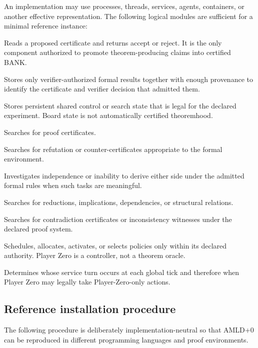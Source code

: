 \documentclass[11pt]{article}
\theoremstyle{definition}
\newcommand{\BANK}{\mathrm{BANK}}
\newcommand{\Board}{\mathcal{B}}
\begin{document}
An implementation may use processes, threads, services, agents, containers, or another effective representation. The following logical modules are sufficient for a minimal reference instance:
\begin{description}[leftmargin=2.2cm,style=nextline]
\item[$V$: Verifier] Reads a proposed certificate and returns accept or reject. It is the only component authorized to promote theorem-producing claims into certified BANK.
\item[$\BANK$: Certified memory] Stores only verifier-authorized formal results together with enough provenance to identify the certificate and verifier decision that admitted them.
\item[$\Board$: Board] Stores persistent shared control or search state that is legal for the declared experiment. Board state is not automatically certified theoremhood.
\item[$P$: Prover] Searches for proof certificates.
\item[$R$: Refuter] Searches for refutation or counter-certificates appropriate to the formal environment.
\item[$I$: Independence role] Investigates independence or inability to derive either side under the admitted formal rules when such tasks are meaningful.
\item[$D$: Dependence role] Searches for reductions, implications, dependencies, or structural relations.
\item[$C$: Contradiction role] Searches for contradiction certificates or inconsistency witnesses under the declared proof system.
\item[$P_0$: Player Zero] Schedules, allocates, activates, or selects policies only within its declared authority. Player Zero is a controller, not a theorem oracle.
\item[$\chi$: Clock/scheduler] Determines whose service turn occurs at each global tick and therefore when Player Zero may legally take Player-Zero-only actions.
\end{description}

\subsection{Reference installation procedure}

The following procedure is deliberately implementation-neutral so that AMLD+0 can be reproduced in different programming languages and proof environments.
\end{document}
